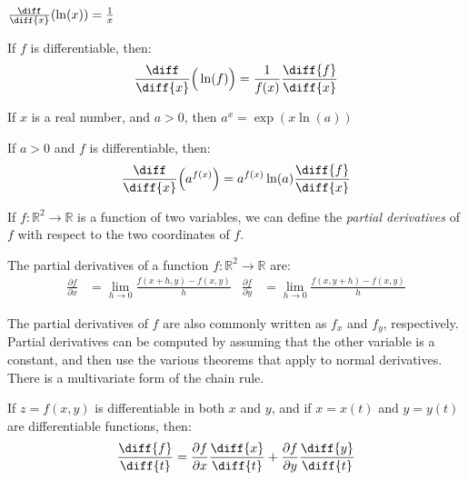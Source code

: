 \documentclass[crop=false,class=book,oneside]{standalone}
\begin{document}
        \begin{theorem}
            $\frac{\diff}{\diff{x}}(\ln(x))=\frac{1}{x}$
        \end{theorem}
        \begin{theorem}
            If $f$ is differentiable, then:
            \begin{equation*}
                \frac{\diff}{\diff{x}}\Big(\ln(f)\Big)
                =\frac{1}{f(x)}\frac{\diff{f}}{\diff{x}}
            \end{equation*}
        \end{theorem}
        \begin{theorem}
            If $x$ is a real number, and $a>0$, then
            $a^{x}=\exp(x\ln(a))$
        \end{theorem}
        \begin{theorem}
            If $a>0$ and $f$ is differentiable, then:
            \begin{equation*}
                \frac{\diff}{\diff{x}}\Big(a^{f(x)}\Big)
                =a^{f(x)}\ln(a)\frac{\diff{f}}{\diff{x}}
            \end{equation*}
        \end{theorem}
        If $f:\mathbb{R}^{2}\rightarrow\mathbb{R}$ is a function
        of two variables, we can define the
        \textit{partial derivatives} of $f$ with respect to
        the two coordinates of $f$.
        \begin{definition}
            The partial derivatives of a function
            $f:\mathbb{R}^{2}\rightarrow\mathbb{R}$ are:
            \begin{align*}
                \frac{\partial{f}}{\partial{x}}
                &=\lim_{h\rightarrow{0}}\frac{f(x+h,y)-f(x,y)}{h}
                &
                \frac{\partial{f}}{\partial{y}}
                &=\lim_{h\rightarrow{0}}\frac{f(x,y+h)-f(x,y)}{h}  
            \end{align*}
        \end{definition}
        The partial derivatives of $f$ are also commonly written as
        $f_{x}$ and $f_{y}$, respectively. Partial derivatives can be
        computed by assuming that the other variable is a constant,
        and then use the various theorems that apply to normal
        derivatives. There is a multivariate form of the chain rule.
        \begin{theorem}
            If $z=f(x,y)$ is differentiable in both $x$ and $y$, and
            if $x=x(t)$ and $y=y(t)$ are differentiable functions, then:
            \begin{equation*}
                \frac{\diff{f}}{\diff{t}}
                =\frac{\partial{f}}{\partial{x}}\frac{\diff{x}}{\diff{t}}
                +\frac{\partial{f}}{\partial{y}}\frac{\diff{y}}{\diff{t}}
            \end{equation*}
        \end{theorem}
\end{document}
